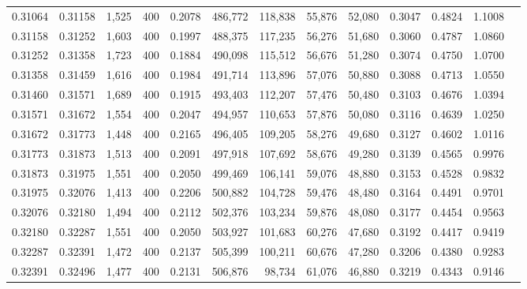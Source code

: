 \begin{tabular}{rrrrrrrrrrrrr}
0.31064 & 0.31158 &  1,525 & 400 &                                     0.2078 & 486,772 & 118,838 &  55,876 &  52,080 & 0.3047 & 0.4824 & 1.1008 \\
0.31158 & 0.31252 &  1,603 & 400 &                                     0.1997 & 488,375 & 117,235 &  56,276 &  51,680 & 0.3060 & 0.4787 & 1.0860 \\
0.31252 & 0.31358 &  1,723 & 400 &                                     0.1884 & 490,098 & 115,512 &  56,676 &  51,280 & 0.3074 & 0.4750 & 1.0700 \\
0.31358 & 0.31459 &  1,616 & 400 &                                     0.1984 & 491,714 & 113,896 &  57,076 &  50,880 & 0.3088 & 0.4713 & 1.0550 \\
0.31460 & 0.31571 &  1,689 & 400 &                                     0.1915 & 493,403 & 112,207 &  57,476 &  50,480 & 0.3103 & 0.4676 & 1.0394 \\
0.31571 & 0.31672 &  1,554 & 400 &                                     0.2047 & 494,957 & 110,653 &  57,876 &  50,080 & 0.3116 & 0.4639 & 1.0250 \\
0.31672 & 0.31773 &  1,448 & 400 &                                     0.2165 & 496,405 & 109,205 &  58,276 &  49,680 & 0.3127 & 0.4602 & 1.0116 \\
0.31773 & 0.31873 &  1,513 & 400 &                                     0.2091 & 497,918 & 107,692 &  58,676 &  49,280 & 0.3139 & 0.4565 & 0.9976 \\
0.31873 & 0.31975 &  1,551 & 400 &                                     0.2050 & 499,469 & 106,141 &  59,076 &  48,880 & 0.3153 & 0.4528 & 0.9832 \\
0.31975 & 0.32076 &  1,413 & 400 &                                     0.2206 & 500,882 & 104,728 &  59,476 &  48,480 & 0.3164 & 0.4491 & 0.9701 \\
0.32076 & 0.32180 &  1,494 & 400 &                                     0.2112 & 502,376 & 103,234 &  59,876 &  48,080 & 0.3177 & 0.4454 & 0.9563 \\
0.32180 & 0.32287 &  1,551 & 400 &                                     0.2050 & 503,927 & 101,683 &  60,276 &  47,680 & 0.3192 & 0.4417 & 0.9419 \\
0.32287 & 0.32391 &  1,472 & 400 &                                     0.2137 & 505,399 & 100,211 &  60,676 &  47,280 & 0.3206 & 0.4380 & 0.9283 \\
0.32391 & 0.32496 &  1,477 & 400 &                                     0.2131 & 506,876 &  98,734 &  61,076 &  46,880 & 0.3219 & 0.4343 & 0.9146 \\

\end{tabular}
